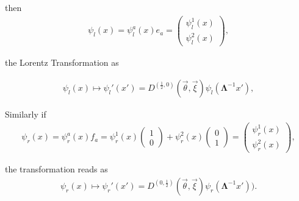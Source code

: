 \documentclass[12pt]{beamer}
\begin{document}
\begin{frame}
\noindent then\\[-10pt]

\begin{align}
\psi_l(x)=\psi^a_l(x)e_a=\begin{pmatrix}\psi^1_l(x)\\\psi^2_l(x)\end{pmatrix},
\end{align}

the Lorentz Transformation as

\begin{align}
\psi_l(x)\longmapsto\psi_l'(x')=D^{(\frac{1}{2},0)}(\vec{\theta},\vec{\xi})\psi_l(\bm{\Lambda}^{-1}x'),
\end{align}

Similarly if\\[-10pt] 

\begin{align}
\psi_r(x)=\psi^a_r(x)f_a=\psi^1_r(x)\begin{pmatrix}1\\0\end{pmatrix}+ \psi^2_r(x)\begin{pmatrix}0\\1\end{pmatrix}=\begin{pmatrix}\psi^1_r(x)\\\psi^2_r(x)\end{pmatrix},
\end{align}

\noindent the transformation reads as\\[-10pt]

\begin{align}
\psi_r(x)\longmapsto\psi_r'(x')=D^{(0,\frac{1}{2})}(\vec{\theta},\vec{\xi})\psi_r(\bm{\Lambda}^{-1}x')).
\end{align}
\end{frame}
\end{document}
